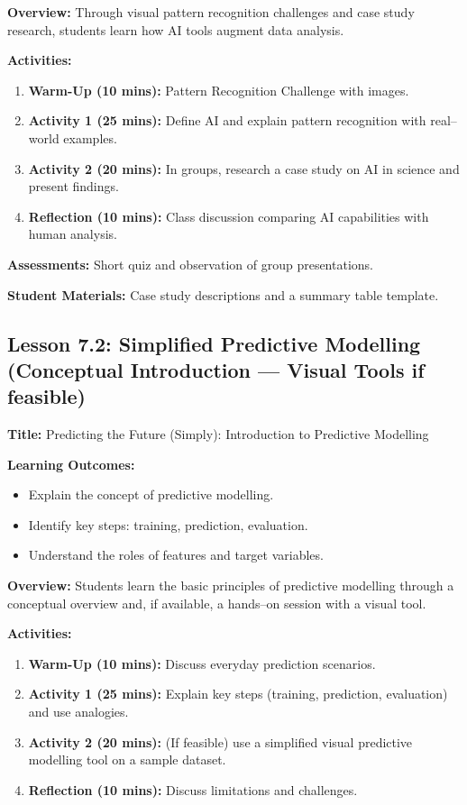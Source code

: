 \documentclass{tufte-book}
\begin{document}
\medskip
\textbf{Overview:}  
Through visual pattern recognition challenges and case study research, students learn how AI tools augment data analysis.

\medskip
\textbf{Activities:}
\begin{enumerate}[label=\arabic*.]
    \item \textbf{Warm-Up (10 mins):} Pattern Recognition Challenge with images.
    \item \textbf{Activity 1 (25 mins):} Define AI and explain pattern recognition with real--world examples.
    \item \textbf{Activity 2 (20 mins):} In groups, research a case study on AI in science and present findings.
    \item \textbf{Reflection (10 mins):} Class discussion comparing AI capabilities with human analysis.
\end{enumerate}

\medskip
\textbf{Assessments:}  
Short quiz and observation of group presentations.

\medskip
\textbf{Student Materials:}  
Case study descriptions and a summary table template.

\subsection{Lesson 7.2: Simplified Predictive Modelling (Conceptual Introduction --- Visual Tools if feasible)}
\textbf{Title:} Predicting the Future (Simply): Introduction to Predictive Modelling

\medskip
\textbf{Learning Outcomes:}
\begin{itemize}[leftmargin=*, label={\textbullet}]
    \item Explain the concept of predictive modelling.
    \item Identify key steps: training, prediction, evaluation.
    \item Understand the roles of features and target variables.
\end{itemize}

\medskip
\textbf{Overview:}  
Students learn the basic principles of predictive modelling through a conceptual overview and, if available, a hands--on session with a visual tool.

\medskip
\textbf{Activities:}
\begin{enumerate}[label=\arabic*.]
    \item \textbf{Warm-Up (10 mins):} Discuss everyday prediction scenarios.
    \item \textbf{Activity 1 (25 mins):} Explain key steps (training, prediction, evaluation) and use analogies.
    \item \textbf{Activity 2 (20 mins):} (If feasible) use a simplified visual predictive modelling tool on a sample dataset.
    \item \textbf{Reflection (10 mins):} Discuss limitations and challenges.
\end{enumerate}
\end{document}

